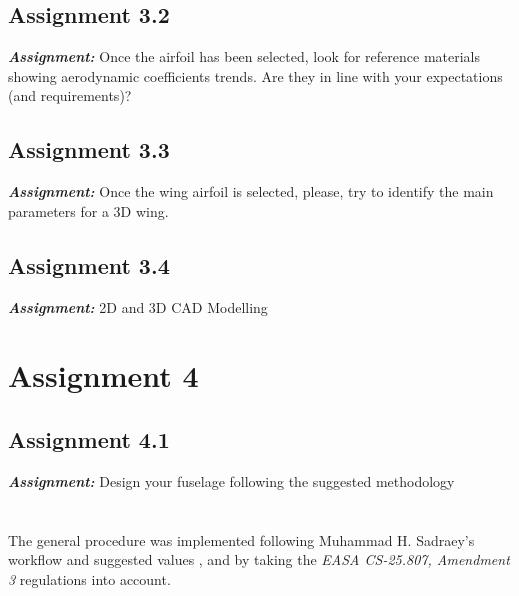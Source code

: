 \documentclass{article}
\begin{document}
\subsection{Assignment 3.2\label{Assignment_3.2}}

\textbf{\textit{Assignment:}} Once the airfoil has been selected, look for reference materials
showing aerodynamic coefficients trends. 
Are they in line with your expectations (and requirements)? 
\clearpage

\subsection{Assignment 3.3\label{Assignment_3.3}}

\textbf{\textit{Assignment:}} Once the wing airfoil is selected, please, 
try to identify the main parameters for a 3D wing. 
\clearpage 
\subsection{Assignment 3.4\label{Assignment_3.4}}

\textbf{\textit{Assignment:}} 2D and 3D CAD Modelling 

\clearpage 

\section{Assignment 4\label{Assignment_4}}

\subsection{Assignment 4.1\label{Assignment_4.1}}

\textbf{\textit{Assignment:}} Design your fuselage following the suggested methodology\\ \\ \\ 

The general procedure was implemented following Muhammad H. Sadraey's workflow and suggested values \autocite{Sadraey_Mohammad},
and by taking the \textit{EASA CS-25.807, Amendment 3} \autocite{EASA_CS25} regulations into account.\\ 
\end{document}
